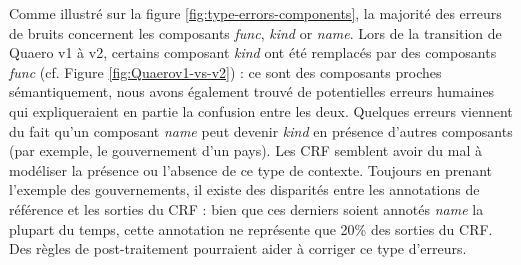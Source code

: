 \documentclass[PhD-Yoann-Dupont.tex]{subfiles}
\begin{document}

Comme illustré sur la figure \ref{fig:type-errors-components}, la majorité des erreurs de bruits concernent les composants \emph{func}, \emph{kind} or \emph{name}. Lors de la transition de Quaero v1 à v2, certains composant \emph{kind} ont été remplacés par des composants \emph{func} (cf. Figure \ref{fig:Quaerov1-vs-v2}) : ce sont des composants proches sémantiquement, nous avons également trouvé de potentielles erreurs humaines qui expliqueraient en partie la confusion entre les deux. Quelques erreurs viennent du fait qu'un composant \emph{name} peut devenir \emph{kind} en présence d'autres composants (par exemple, le gouvernement d'un pays). Les CRF semblent avoir du mal à modéliser la présence ou l'absence de ce type de contexte. Toujours en prenant l'exemple des gouvernements, il existe des disparités entre les annotations de référence et les sorties du CRF : bien que ces derniers soient annotés \emph{name} la plupart du temps, cette annotation ne représente que 20\% des sorties du CRF. Des règles de post-traitement pourraient aider à corriger ce type d'erreurs.
\end{document}
